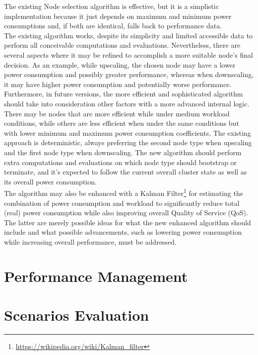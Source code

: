 The existing Node selection algorithm is effective, but it is a simplistic implementation
because it just depends on maximum and minimum power consumptions and, if both
are identical, falls back to performance data. \\ %
The existing algorithm works, despite its simplicity and limited accessible data
to perform all conceivable computations and evaluations. Nevertheless, there are
several aspects where it may be refined to accomplish a more suitable node's
final decision. As an example, while upscaling, the chosen node may have a lower
power consumption and possibly greater performance, whereas when downscaling, it
may have higher power consumption and potentially worse performance. Furthermore,
in future versions, the more efficient and sophisticated algorithm should take
into consideration other factors with a more advanced internal logic. There may be
nodes that are more efficient while under medium workload conditions, while
others are less efficient when under the same conditions but with lower minimum
and maximum power consumption coefficients. The existing approach is deterministic,
always preferring the second node type when upscaling and the first node type
when downscaling. The new algorithm should perform extra computations and evaluations
on which node type should bootstrap or terminate, and it's expected to follow
the current overall cluster state as well as its overall power consumption. \\ %
The algorithm may also be enhanced with a Kalman Filter\footnote{\url{https://wikipedia.org/wiki/Kalman_filter}}
for estimating the combination of power consumption and workload to
significantly reduce total (real) power consumption while also improving overall
Quality of Service (QoS). \\ %
The latter are merely possible ideas for what the new enhanced algorithm should
include and what possible advancements, such as lowering power consumption while
increasing overall performance, must be addressed.

\section{Performance Management}
\label{subsec:conclusions_limitations_and_future_works_performance_management}

\section{Scenarios Evaluation}
\label{subsec:conclusions_limitations_and_future_works_scenarios_evaluation}


